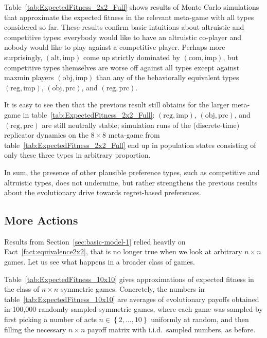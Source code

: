 \documentclass[fleqn,reqno,12pt]{article}
\theoremstyle{Satz}
\theoremstyle{Bsp}
\newcommand{\set}[1]{\left\{#1\right\}}
\newcommand{\myalert}[1]{\textcolor{red}{#1}}
\begin{document}
Table~\ref{tab:ExpectedFitness_2x2_Full} shows results of Monte Carlo simulations that
approximate the expected fitness in the relevant meta-game with all types considered so
far. These results confirm basic intuitions about altruistic and competitive types: everybody would like to have an altruistic co-player and nobody
would like to play against a competitive player. Perhaps more surprisingly, $(\text{alt}, \text{imp})$
come up strictly dominated by $(\text{com}, \text{imp})$, but competitive types themselves are worse off
against all types except against maxmin players $(\text{obj}, \text{imp})$ than any of
the behaviorally equivalent types $(\text{reg}, \text{imp})$, $(\text{obj}, \text{prc})$, and
$(\text{reg}, \text{prc})$.
\iffalse This is a noteworthy results in the light of the fact
that evolving altruistic preferences have been shown to support cooperative behavior in a
single stage game \myalert{[CITE]}. In contrast, averaging over payoffs in multiple stage
games, like we do here, makes altruistic preferences prime victims of evolutionary eradication.
\fi
It is easy to see then that the previous result still obtains for the larger meta-game in
table~\ref{tab:ExpectedFitness_2x2_Full}: $(\text{reg}, \text{imp})$,
$(\text{obj}, \text{prc})$, and $(\text{reg}, \text{prc})$ are still neutrally stable;
simulation runs of the (discrete-time) replicator dynamics on the $8 \times 8$ meta-game from
table~\ref{tab:ExpectedFitness_2x2_Full} end up in population states consisting of only these
three types in arbitrary proportion.

In sum, the presence of other plausible preference types, such as competitive and altruistic
types, does not undermine, but rather strengthens the previous results about the evolutionary
drive towards regret-based preferences.


                                   
\subsection{More Actions}
\label{sec:n-times-n}

Results from Section~\ref{sec:basic-model-1} relied heavily on Fact~\ref{fact:equivalence2x2}, that
is no longer true when we look at arbitrary $n \times n$ games. Let us see what
happens in a broader class of games.

Table~\ref{tab:ExpectedFitness_10x10} gives approximations of expected fitness in the class of
$n \times n$ symmetric games. Concretely,
the numbers in table~\ref{tab:ExpectedFitness_10x10} are averages of evolutionary payoffs obtained in
100,000 randomly sampled symmetric games, where each game was sampled by first picking a number of acts
$n \in \set{2, \dots, 10}$ uniformly at random, and then filling the necessary $n \times n$
payoff matrix with i.i.d.~sampled numbers, as before.
\end{document}
